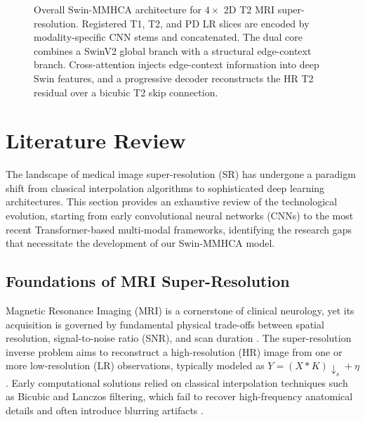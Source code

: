 \documentclass{IEEEoj}
\begin{document}
\begin{figure}[t]
{%
}
\caption{Overall Swin-MMHCA architecture for $4\times$ 2D T2 MRI super-resolution. Registered T1, T2, and PD LR slices are encoded by modality-specific CNN stems and concatenated. The dual core combines a SwinV2 global branch with a structural edge-context branch. Cross-attention injects edge-context information into deep Swin features, and a progressive decoder reconstructs the HR T2 residual over a bicubic T2 skip connection.}
\label{fig:swin_mmhca_architecture}
\end{figure}



\section{Literature Review}
The landscape of medical image super-resolution (SR) has undergone a paradigm shift from classical interpolation algorithms to sophisticated deep learning architectures. This section provides an exhaustive review of the technological evolution, starting from early convolutional neural networks (CNNs) to the most recent Transformer-based multi-modal frameworks, identifying the research gaps that necessitate the development of our Swin-MMHCA model.

\subsection{Foundations of MRI Super-Resolution}
Magnetic Resonance Imaging (MRI) is a cornerstone of clinical neurology, yet its acquisition is governed by fundamental physical trade-offs between spatial resolution, signal-to-noise ratio (SNR), and scan duration \cite{ixi_dataset, med_sr_survey}. The super-resolution inverse problem aims to reconstruct a high-resolution (HR) image from one or more low-resolution (LR) observations, typically modeled as $Y = (X \ast K) \downarrow_s + \eta$ \cite{srcnn, tpami_survey}. Early computational solutions relied on classical interpolation techniques such as Bicubic and Lanczos filtering, which fail to recover high-frequency anatomical details and often introduce blurring artifacts \cite{vdsr}.
\end{document}
